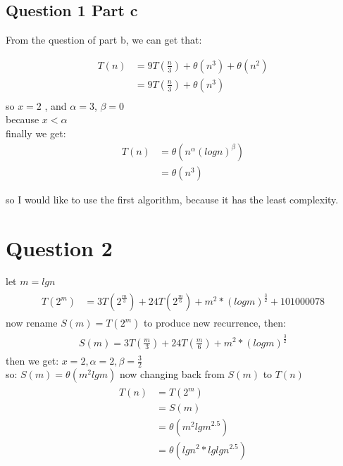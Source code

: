 \documentclass[paper=a4, fontsize=11pt]{scrartcl} %
\numberwithin{equation}{section} %
\numberwithin{figure}{section} %
\numberwithin{table}{section} %
\begin{document}
\subsection{Question 1 Part c}
From the question of part b, we can get that:

\begin{equation*}
\begin{split}
T(n) &=9T(\frac{n}{3})+ \theta(n^3)+\theta(n^2)\\
     &=9T(\frac{n}{3})+ \theta(n^3)\\
\end{split}					
\end{equation*}
so $x=2$ , and $ \alpha=3 $, $\beta=0 $\\
because $x<\alpha $\\
finally we get:
\begin{equation*}
\begin{split}
T(n) &=\theta(n^{\alpha}({logn})^{\beta})\\
    &=\theta(n^3)
\end{split}					
\end{equation*}

so I would like to use the first algorithm, because it has the least complexity.
\vspace{2cm}
\section{Question 2}
let $m=lgn$
\begin{align*}
\begin{split}
T(2^m) &=3T(2^{\frac{m}{3}})+24T(2^{\frac{m}{6}})+m^2*(log m)^{\frac{3}{2}}+101000078
\end{split}
\end{align*}
now rename $S(m)=T(2^m)$ to produce new recurrence, then:\\
\begin{align*}
\begin{split}
S(m)=3T(\frac{m}{3})+24T(\frac{m}{6})+m^2*(log m)^{\frac{3}{2}}
\end{split}
\end{align*}
then we get: $x=2, \alpha=2 , \beta=\frac{3}{2}$\\
so: $S(m)=\theta(m^{2}lgm)$
now changing back from $ S(m)$ to $T(n) $
\begin{align*}
\begin{split}
T(n) &=T(2^m)\\
    &=S(m)\\
    &=\theta(m^{2}{lgm}^{2.5})\\
    &=\theta({lgn}^2*{lglgn}^{2.5})\\
\end{split}
\end{align*}
\end{document}
